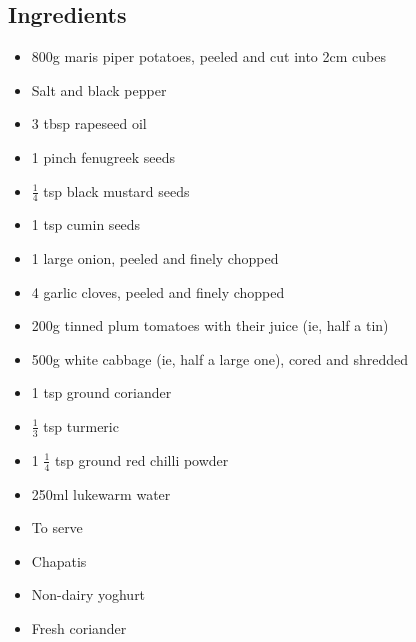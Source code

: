 \documentclass{book}
\begin{document}
\subsection*{Ingredients}
\begin{itemize}
\item 800g maris piper potatoes, peeled and cut into 2cm cubes
\item Salt and black pepper
\item 3 tbsp rapeseed oil
\item 1 pinch fenugreek seeds
\item $\frac{1}{4}$ tsp black mustard seeds
\item 1 tsp cumin seeds
\item 1 large onion, peeled and finely chopped
\item 4 garlic cloves, peeled and finely chopped
\item 200g tinned plum tomatoes with their juice (ie, half a tin)
\item 500g white cabbage (ie, half a large one), cored and shredded
\item 1 tsp ground coriander
\item $\frac{1}{3}$ tsp turmeric
\item 1 $\frac{1}{4}$ tsp ground red chilli powder
\item 250ml lukewarm water
\end{itemize}

\begin{itemize}
\item To serve
\item Chapatis
\item Non-dairy yoghurt
\item Fresh coriander
\end{itemize}
\end{document}
